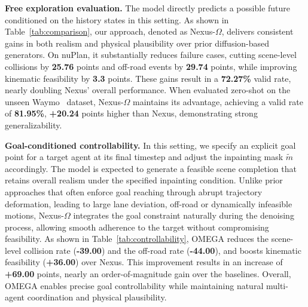 \documentclass[10pt,twocolumn,letterpaper]{article}
\theoremstyle{plain}
\theoremstyle{remark}
\renewcommand{\paragraph}[1]{\vspace{.5em}\noindent\textbf{#1.}}
\begin{document}
\paragraph{Free exploration evaluation}
The model directly predicts a possible future conditioned on the history states in this setting. 
As shown in Table~\ref{tab:comparison}, our approach, denoted as Nexus-$\Omega$, delivers consistent gains in both realism and physical plausibility over prior diffusion-based generators. On nuPlan, it substantially reduces failure cases, cutting scene-level collisions by \textbf{25.76} points and off-road events by \textbf{29.74} points, while improving kinematic feasibility by \textbf{3.3} points. These gains result in a \textbf{72.27\%} valid rate, nearly doubling Nexus' overall performance. When evaluated zero-shot on the unseen Waymo~\cite{WaymoMotion} dataset, Nexus-$\Omega$ maintains its advantage, achieving a valid rate of \textbf{81.95\%}, \textbf{+20.24} points higher than Nexus, demonstrating strong generalizability.




\paragraph{Goal-conditioned controllability}
In this setting, we specify an explicit goal point for a target agent at its final timestep and adjust the inpainting mask $\tilde{m}$ accordingly. The model is expected to generate a feasible scene completion that retains overall realism under the specified inpainting condition. Unlike prior approaches that often enforce goal reaching through abrupt trajectory deformation, leading to large lane deviation, off-road or dynamically infeasible motions, Nexus-$\Omega$ integrates the goal constraint naturally during the denoising process, allowing smooth adherence to the target without compromising feasibility. As shown in Table~\ref{tab:controllability}, OMEGA reduces the scene-level collision rate (\textbf{-39.00}) and the off-road rate (\textbf{-44.00}), and boosts kinematic feasibility (\textbf{+36.00}) over Nexus. This improvement results in an increase of \textbf{+69.00} points, nearly an order-of-magnitude gain over the baselines. Overall, OMEGA enables precise goal controllability while maintaining natural multi-agent coordination and physical plausibility.
\end{document}
